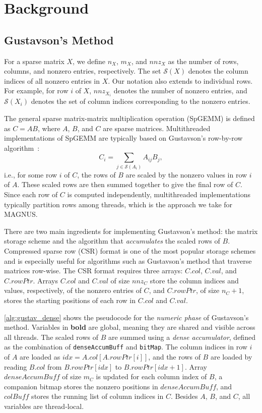 \section{Background}\label{sec:background}
\subsection{Gustavson's Method}\label{sec:gustav}
For a sparse matrix $X$, we define $n_X$, $m_X$, and $nnz_X$ as the number of rows, columns, and nonzero entries, respectively. The set $\mathcal{S}(X)$ denotes the column indices of all nonzero entries in $X$.
Our notation also extends to individual rows.
For example, for row $i$ of $X$, $nnz_{X_i}$ denotes the number of nonzero entries, and $\mathcal{S}(X_i)$ denotes the set of column indices corresponding to the nonzero entries.

The general sparse matrix-matrix multiplication operation (SpGEMM) is defined as $C=A B$, where $A$, $B$, and $C$ are sparse matrices.
Multithreaded implementations of SpGEMM are typically based on Gustavson's row-by-row algorithm~\cite{gustavson}:
\begin{equation}
    C_i = \sum_{j\in \mathcal{S}(A_i)} A_{ij}B_j,
    \label{equ:gustav}
\end{equation}
i.e., for some row $i$ of $C$, the rows of $B$ are scaled by the nonzero values in row $i$ of $A$.
These scaled rows are then summed together to give the final row of $C$.
Since each row of $C$ is computed independently, multithreaded implementations typically partition rows among threads,
which is the approach we take for MAGNUS.

There are two main ingredients for implementing Gustavson's method: the matrix storage scheme and the algorithm that \emph{accumulates} the scaled rows of $B$.
Compressed sparse row (CSR) format is one of the most popular storage schemes and is especially useful for algorithms such as Gustavson's method that traverse matrices row-wise. 
The CSR format requires three arrays: $C.col$, $C.val$, and $C.rowPtr$.
Arrays $C.col$ and $C.val$ of size $nnz_C$ store the column indices and values, respectively, of the nonzero entries of $C$, and $C.rowPtr$, of size $n_C+1$, stores the starting positions of each row in $C.col$ and $C.val$.

\autoref{alg:gustav_dense} shows the pseudocode for the \emph{numeric phase} of Gustavson's method. Variables in \textbf{bold} are global, meaning they are shared and visible across all threads.  
The scaled rows of $B$ are summed using a \emph{dense accumulator}, defined as the combination of \texttt{denseAccumBuff} and \texttt{bitMap}.
The column indices in row $i$ of $A$ are loaded as $idx = A.col[A.rowPtr[i]]$, and the rows of $B$ are loaded by reading $B.col$ from $B.rowPtr[idx]$ to $B.rowPtr[idx+1]$.
Array $denseAccumBuff$ of size $m_C$ is updated
for each column index of $B$, a companion bitmap stores the nonzero positions in $denseAccumBuff$, and $colBuff$ stores the running list of column indices in $C$.
Besides $A$, $B$, and $C$, all variables are thread-local.


